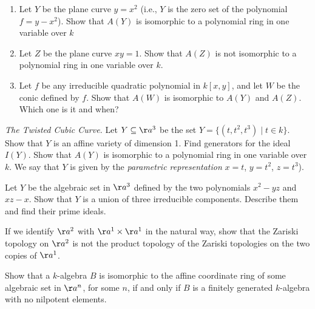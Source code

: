 \begin{exercise}[1.1]
    \begin{enumerate}
        \item Let $Y$ be the plane curve $y = x^2$ (i.e., $Y$ is the zero set of 
        the polynomial $f = y - x^2$). Show that $A(Y)$ is isomorphic to a polynomial ring 
        in one variable over $k$

        \item Let $Z$ be the plane curve $xy = 1$. Show that $A(Z)$ is not isomorphic to 
        a polynomial ring in one variable over $k$. 
        
        \item Let $f$ be any irreducible quadratic polynomial in $k[x, y]$, and let 
        $W$ be the conic defined by $f$. Show that $A(W)$ is isomorphic to $A(Y)$ and $A(Z)$.
        Which one is it and when? 
    \end{enumerate}
\end{exercise}

\begin{exercise}[1.2]
    \emph{The Twisted Cubic Curve.}
    Let $Y \subseteq \aa^3$ be the set $Y = \{(t,t^2,t^3) \mid t \in k\}$.
    Show that $Y$ is an affine variety of dimension 1. Find generators 
    for the ideal $I(Y)$. Show that $A(Y)$ is isomorphic to a polynomial ring 
    in one variable over $k$. We say that $Y$ is given by the \emph{parametric representation} 
    $x = t$, $y = t^2$, $z = t^3$). 
\end{exercise}

\begin{exercise}[1.3]
    Let $Y$ be the algebraic set in $\aa^3$ defined by the two polynomials
    $x^2 - yz$ and $xz - x$.
    Show that $Y$ is a union of three irreducible components.
    Describe them and find their prime ideals.
\end{exercise}

\begin{exercise}[1.4]
    If we identify $\aa^2$ with $\aa^1 \times \aa^1$ in the natural way, show
    that the Zariski topology on $\aa^2$ is not the product topology of the
    Zariski topologies on the two copies of $\aa^1$.
\end{exercise}

\begin{exercise}[1.5]
    Show that a $k$-algebra $B$ is isomorphic to the affine coordinate ring of
    some algebraic set in $\aa^n$, for some $n$, if and only if $B$ is a
    finitely generated $k$-algebra with no nilpotent elements.
\end{exercise}

